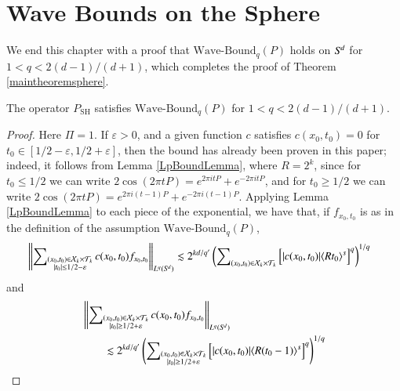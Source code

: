 \section{Wave Bounds on the Sphere}

We end this chapter with a proof that $\text{Wave-Bound}_q(P)$ holds on ${S}^{\!{d}}$ for $1 < q < 2(d-1)/(d+1)$, which completes the proof of Theorem \ref{maintheoremsphere}.

\begin{lemma} \label{lemdoiajoidjwaio13123}
    The operator $P_{\text{SH}}$ satisfies $\text{Wave-Bound}_q(P)$ for $1 < q < 2(d-1)/(d+1)$.
\end{lemma}
\begin{proof}
    Here $\Pi = 1$. If $\varepsilon > 0$, and a given function $c$ satisfies $c(x_0,t_0) = 0$ for $t_0 \in [1/2 - \varepsilon, 1/2 + \varepsilon]$, then the bound has already been proven in this paper; indeed, it follows from Lemma \ref{LpBoundLemma}, where $R = 2^k$, since for $t_0 \leq 1/2$ we can write $2 \cos(2 \pi t P) = e^{2 \pi i t P} + e^{-2 \pi i t P}$, and for $t_0 \geq 1/2$ we can write $2 \cos(2 \pi t P) = e^{2 \pi i (t - 1) P} + e^{-2 \pi i (t - 1) P}$. Applying Lemma \ref{LpBoundLemma} to each piece of the exponential, we have that, if $f_{x_0,t_0}$ is as in the definition of the assumption $\text{Wave-Bound}_q(P)$,
    \begin{equation}
    \begin{split}
        &\left\| \sum\nolimits_{\substack{(x_0,t_0) \in \mathcal{X}_k \times \mathcal{T}_k\\|t_0| \leq 1/2 - \varepsilon}} c(x_0,t_0) f_{x_0,t_0} \right\|_{L^q({S}^{\!{d}})} \lesssim 2^{kd/q'} \left( \sum\nolimits_{(x_0,t_0) \in \mathcal{X}_k \times \mathcal{T}_k} \Big[ |c(x_0,t_0)| \langle R t_0 \rangle^{s} \Big]^q \right)^{1/q}
    \end{split}
    \end{equation}
    and
    \begin{equation}
    \begin{split}
        &\left\| \sum\nolimits_{\substack{(x_0,t_0) \in \mathcal{X}_k \times \mathcal{T}_k\\|t_0| \geq 1/2 + \varepsilon}} c(x_0,t_0) f_{x_0,t_0} \right\|_{L^q(\Sd{d})} \\
        &\quad\quad \lesssim 2^{kd/q'} \left( \sum\nolimits_{\substack{(x_0,t_0) \in \mathcal{X}_k \times \mathcal{T}_k\\|t_0| \geq 1/2 + \varepsilon}} \Big[ |c(x_0,t_0)| \langle R (t_0 - 1) \rangle^{s} \Big]^q \right)^{1/q}\\

\end{split}
\end{equation}
\end{proof}

